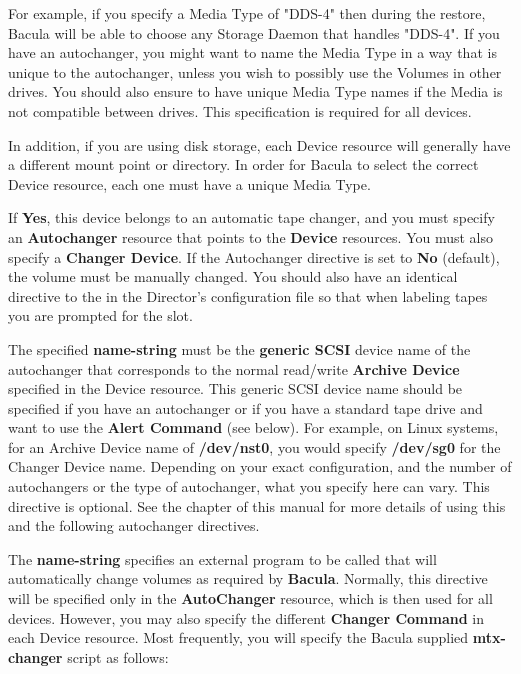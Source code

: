 \begin{description}
   For example, if you specify a Media Type of "DDS-4" then during the
   restore, Bacula will be able to choose any Storage Daemon that handles
   "DDS-4".  If you have an autochanger, you might want to name the Media Type
   in a way that is unique to the autochanger, unless you wish to possibly use
   the Volumes in other drives.  You should also ensure to have unique Media
   Type names if the Media is not compatible between drives.  This
   specification is required for all devices.

   In addition, if you are using disk storage, each Device resource will
   generally have a different mount point or directory. In order for
   Bacula to select the correct Device resource, each one must have a
   unique Media Type.

\label{Autochanger}
\item [Autochanger = {\it yes\vb{}no}]
   If {\bf Yes}, this device belongs to an automatic tape changer, and you
   must specify an {\bf Autochanger} resource that points to the {\bf
   Device} resources.  You must also specify a 
   {\bf Changer Device}.  If the Autochanger directive is set to {\bf
   No} (default), the volume must be manually changed.  You should also
   have an identical directive to the  
     in the Director's
   configuration file so that  when labeling tapes you are prompted for the slot.

\item [Changer Device = {\it name-string}]
   The specified {\bf name-string} must be the {\bf generic SCSI} device
   name of the autochanger that corresponds to the normal read/write
   {\bf Archive Device}  specified in the Device resource. This
   generic SCSI device name should be specified if you have an autochanger 
   or if you have a standard tape drive and want to use the
   {\bf Alert Command} (see below). For example, on Linux systems, for 
   an Archive Device name of {\bf /dev/nst0}, you would specify {\bf
   /dev/sg0} for the Changer Device name. Depending on your exact
   configuration, and the number of autochangers or the type of
   autochanger, what you specify here can vary.  This directive is
   optional.  See the  chapter
   of this manual for more details of using this and the following
   autochanger directives.

\item [Changer Command = {\it name-string}]
   The {\bf name-string} specifies an external program to be called  that will
   automatically change volumes as required by {\bf Bacula}.  Normally,
   this directive will be specified only in the {\bf AutoChanger} resource,
   which is then used for all devices.  However, you may also specify
   the different {\bf Changer Command} in each Device resource.
   Most frequently,
   you will specify the Bacula supplied {\bf mtx-changer}  script as follows:  


\end{description}
